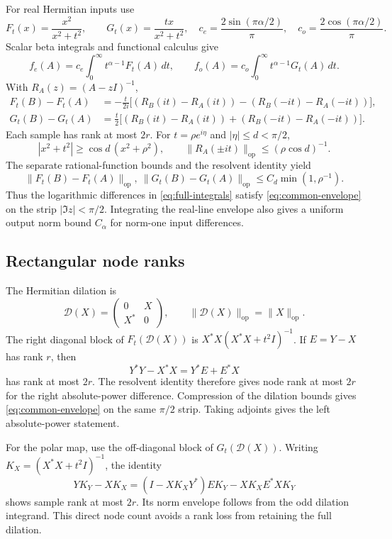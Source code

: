 \documentclass[11pt]{article}
\numberwithin{equation}{section}
\newcommand{\op}{\mathrm{op}}
\newcommand{\cD}{\mathcal D}
\begin{document}
For real Hermitian inputs use
\[
 F_t(x)=\frac{x^2}{x^2+t^2},\qquad G_t(x)=\frac{tx}{x^2+t^2},
 \quad c_e=\frac{2\sin(\pi\alpha/2)}\pi,
 \quad c_o=\frac{2\cos(\pi\alpha/2)}\pi.
\]
Scalar beta integrals and functional calculus give
\begin{equation}\label{eq:full-integrals}
 f_e(A)=c_e\int_0^\infty t^{\alpha-1}F_t(A)\,dt,
 \qquad
 f_o(A)=c_o\int_0^\infty t^{\alpha-1}G_t(A)\,dt.
\end{equation}
With $R_A(z)=(A-zI)^{-1}$,
\begin{align*}
 F_t(B)-F_t(A)
 &=-\frac{t}{2i}\big[(R_B(it)-R_A(it))
                          -(R_B(-it)-R_A(-it))\big],\\
 G_t(B)-G_t(A)
 &=\frac t2\big[(R_B(it)-R_A(it))
                          +(R_B(-it)-R_A(-it))\big].
\end{align*}
Each sample has rank at most $2r$. For $t=\rho e^{i\eta}$ and
$|\eta|\le d<\pi/2$,
\[
 |x^2+t^2|\ge\cos d\,(x^2+\rho^2),\qquad
 \|R_A(\pm it)\|_\op\le(\rho\cos d)^{-1}.
\]
The separate rational-function bounds and the resolvent identity yield
\[
 \|F_t(B)-F_t(A)\|_\op,
 \ \|G_t(B)-G_t(A)\|_\op
       \le C_d\min(1,\rho^{-1}).
\]
Thus the logarithmic differences in \eqref{eq:full-integrals} satisfy
\eqref{eq:common-envelope} on the strip $|\Im z|<\pi/2$.
Integrating the real-line envelope also gives a uniform output norm
bound $C_\alpha$ for norm-one input differences.

\subsection*{Rectangular node ranks}
The Hermitian dilation is
\[
 \cD(X)=\begin{pmatrix}0&X\\X^*&0\end{pmatrix},
 \qquad \|\cD(X)\|_\op=\|X\|_\op.
\]
The right diagonal block of $F_t(\cD(X))$ is
$X^*X(X^*X+t^2I)^{-1}$. If $E=Y-X$ has rank $r$, then
\[
 Y^*Y-X^*X=Y^*E+E^*X
\]
has rank at most $2r$. The resolvent identity therefore gives node
rank at most $2r$ for the right absolute-power difference. Compression
of the dilation bounds gives \eqref{eq:common-envelope} on the same
$\pi/2$ strip. Taking adjoints gives the left absolute-power statement.

For the polar map, use the off-diagonal block of $G_t(\cD(X))$.
Writing $K_X=(X^*X+t^2I)^{-1}$, the identity
\begin{equation}\label{eq:polar-rank}
 YK_Y-XK_X
   =(I-XK_XY^*)EK_Y-XK_XE^*XK_Y
\end{equation}
shows sample rank at most $2r$. Its norm envelope follows from the odd
dilation integrand. This direct node count avoids a rank loss from
retaining the full dilation.
\end{document}
